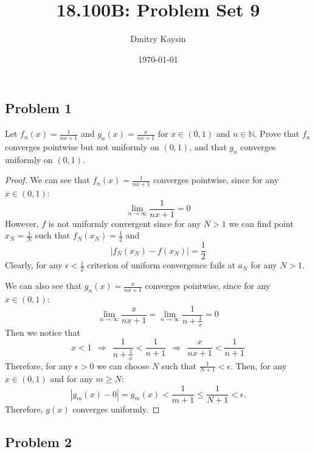 \documentclass{article}
\title{18.100B: Problem Set 9}
\author{Dmitry Kaysin}
\date\today
\begin{document}
\maketitle 

\subsection*{Problem 1}

\begin{tcolorbox}
Let $f_n(x) = \frac{1}{nx+1}$ and $g_n(x) = \frac{x}{nx+1}$ for $x \in (0, 1)$ and $n \in \mathbb{N}$. Prove that $f_n$ converges pointwise but not uniformly on $(0, 1)$, and that $g_n$ converges uniformly on $(0, 1)$.
\end{tcolorbox}
\begin{proof}
We can see that $f_n(x) = \frac{1}{nx+1}$ converges pointwise, since for any $x \in (0,1)$:
$$ \lim_{n \to \infty} \frac{1}{nx+1} = 0 $$
However, $f$ is not uniformly convergent since for any $N > 1$ we can find point $x_N = \frac{1}{N}$ such that $f_N(x_N) = \frac{1}{2}$ and
$$ | f_N(x_N) - f(x_N) | = \frac{1}{2} $$
Clearly, for any $\epsilon < \frac{1}{2}$ criterion of uniform convergence fails at $a_N$ for any $N > 1$.

We can also see that $g_n(x) = \frac{x}{nx+1}$ converges pointwise, since for any $x \in (0,1)$:
$$ \lim_{n \to \infty} \frac{x}{nx+1} = \lim_{n \to \infty} \frac{1}{n+\frac{1}{x}} = 0 $$
Then we notice that
$$ x < 1 \>\> \Rightarrow \>\> \frac{1}{n+\frac{1}{x}} < \frac{1}{n+1} \>\> \Rightarrow \>\> \frac{x}{nx+1} < \frac{1}{n+1} $$
Therefore, for any $\epsilon>0$ we can choose $N$ such that $ \frac{1}{N+1} < \epsilon$. Then, for any $x \in (0,1)$ and for any $m \geq N$:
$$ | g_m(x) - 0 | = g_m(x) < \frac{1}{m+1} \leq \frac{1}{N+1} < \epsilon. $$
Therefore, $g(x)$ converges uniformly.
\end{proof}


\subsection*{Problem 2}
\end{document}
